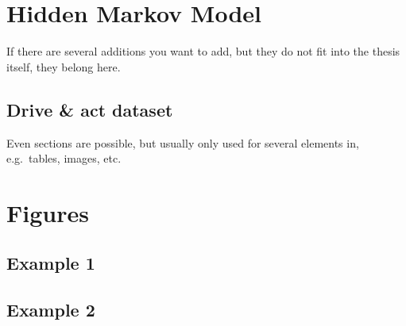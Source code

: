 \chapter{Hidden Markov Model}\label{chapter:appendix}

If there are several additions you want to add, but they do not fit into the thesis itself, they belong here.

\section{Drive \& act dataset}

Even sections are possible, but usually only used for several elements in, e.g.\ tables, images, etc.

\chapter{Figures}
\section{Example 1}
\cmark
\section{Example 2}
\xmark